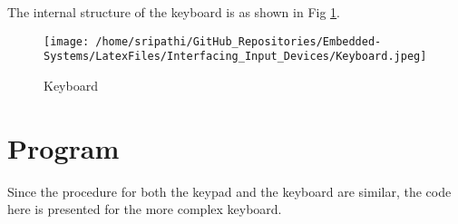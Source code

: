 \documentclass[12pt, letterpaper]{article}
\begin{document}
The internal structure of the keyboard is as shown in Fig \ref{fig:keyboard}.

\begin{figure}[!h]
	\centering
	\texttt{[image: /home/sripathi/GitHub\_Repositories/Embedded-Systems/LatexFiles/Interfacing\_Input\_Devices/Keyboard.jpeg]}
	\caption{Keyboard}
	\label{fig:keyboard}
\end{figure}

\newpage

\section{Program}

Since the procedure for both the keypad and the keyboard are similar, the code here is presented for the more complex keyboard. 
\end{document}
